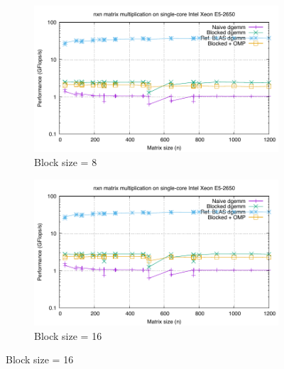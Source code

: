 \begin{figure}[H]
    \vspace{1em}
    
    \begin{subfigure}[b]{0.48\textwidth}
        \centering
        \includegraphics[width=\textwidth]{../src/3-Optimize-Matrix-Matrix-Mult/results/timing-08.pdf}
        \caption{Block size = 8}
        \label{fig:timing-08}
    \end{subfigure}
    \hfill
    \begin{subfigure}[b]{0.48\textwidth}
        \centering
        \includegraphics[width=\textwidth]{../src/3-Optimize-Matrix-Matrix-Mult/results/timing-16.pdf}
        \caption{Block size = 16}
        \label{fig:timing-16}
    \end{subfigure}
    
    \vspace{1em}
    

\end{figure}
